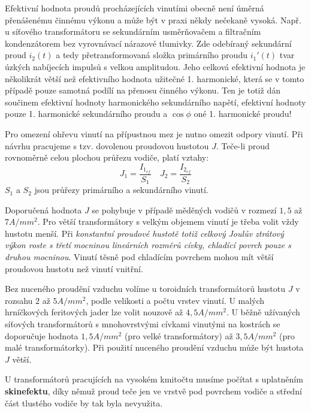       Efektivní hodnota proudů procházejících vinutími obecně není úměrná přenášenému činnému výkonu a může 
      být v praxi někdy nečekaně vysoká. Např. u síťového transformátoru se sekundárním usměrňovačem a 
      filtračním kondenzátorem bez vyrovnávací nárazové tlumivky. Zde odebíraný sekundární proud $i_2(t)$ a 
      tedy přetransformovaná složka primárního proudu $i_1'(t)$ tvar úzkých nabíjecích impulsů s velkou 
      amplitudou. Jeho celková efektivní hodnota je několikrát větší než efektivního hodnota užitečné 1. 
      harmonické, která se v tomto případě pouze samotná podílí na přenosu činného výkonu. Ten je totiž dán 
      součinem efektivní hodnoty harmonického sekundárního napětí, efektivní hodnoty pouze 1. harmonické 
      sekundárního proudu a $\cos\phi$ oné 1. harmonické proudu!

      Pro omezení ohřevu vinutí na přípustnou mez je nutno omezit odpory vinutí. Při návrhu pracujeme s tzv. 
      dovolenou proudovou hustotou $J$. Teče-li proud rovno\-měr\-ně celou plochou průřezu vodiče, platí 
      vztahy:
      \begin{equation}\label{es_proud_hustota}
        J_1=\frac{I_{1_{ef}}}{S_1} \quad J_2=\frac{I_{2_{ef}}}{S_2}
      \end{equation}
      $S_1$ a $S_2$ jsou průřezy primárního  a sekundárního vinutí.

      Doporučená hodnota $J$ se pohybuje v případě měděných vodičů v rozmezí $1,5$ až $7 A/mm^2$. Pro větší 
      transformátory s velkým objemem vinutí je třeba volit vždy hustotu menší. Při \emph{konstantní proudové 
      hustotě totiž celkový Joulův ztrátový výkon roste s třetí mocninou lineárních rozměrů cívky, chladící 
      povrch pouze s druhou mocninou}. Vinutí těsně pod chladícím povrchem mohou mít větší proudovou hustotu 
      než vinutí vnitřní.

      Bez nuceného proudění vzduchu volíme u toroidních transformátorů hustotu $J$ v rozsahu $2$ až
      $5 A/mm^2$, podle velikosti a počtu vrstev vinutí. U malých hrníčkových feritových jader lze volit 
      nouzově až $4,5 A/mm^2$. U běžně užívaných síťových transformátorů s mnohovrstvými cívkami vinutými na 
      kostrách se doporučuje hodnota $1,5 A/mm^2$ (pro velké transformátory) až $3,5 A/mm^2$ (pro malé 
      transformátorky). Při použití nuceného proudění vzduchu může být hustota $J$ větší.

      U transformátorů pracujících na vysokém kmitočtu musíme počítat s uplatněním \textbf{skinefektu}, díky 
      němuž proud teče jen ve vrstvě pod povrchem vodiče a střední část tlustého vodiče by tak byla nevyužita.

